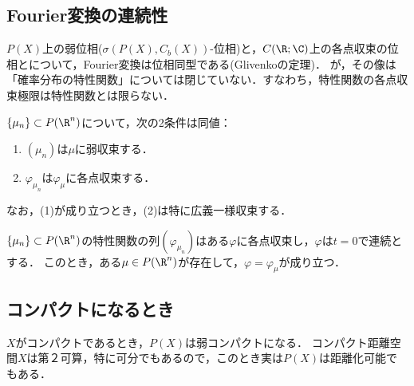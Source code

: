 \documentclass[uplatex,dvipdfmx]{jsreport}
\begin{document}
\subsection{Fourier変換の連続性}

\begin{tcolorbox}[colframe=ForestGreen, colback=ForestGreen!10!white,breakable,colbacktitle=ForestGreen!40!white,coltitle=black,fonttitle=\bfseries\sffamily,
    title=]
    $P(X)$上の弱位相($\sigma(P(X),C_b(X))$-位相)と，$C(\R;\C)$上の各点収束の位相とについて，Fourier変換は位相同型である(Glivenkoの定理)．
    が，その像は「確率分布の特性関数」については閉じていない．すなわち，特性関数の各点収束極限は特性関数とは限らない．
    \cite{ハンドブック}
\end{tcolorbox}

\begin{theorem}[Glivenko]
    $\{\mu_n\}\subset P(\R^n)$について，次の2条件は同値：
    \begin{enumerate}
        \item $(\mu_n)$は$\mu$に弱収束する．
        \item $\varphi_{\mu_n}$は$\varphi_\mu$に各点収束する．
    \end{enumerate}
    なお，(1)が成り立つとき，(2)は特に広義一様収束する．
\end{theorem}

\begin{theorem}[Levyの連続性定理]
    $\{\mu_n\}\subset P(\R^n)$の特性関数の列$(\varphi_{\mu_n})$はある$\varphi$に各点収束し，$\varphi$は$t=0$で連続とする．
    このとき，ある$\mu\in P(\R^n)$が存在して，$\varphi=\varphi_\mu$が成り立つ．
\end{theorem}

\subsection{コンパクトになるとき}

\begin{tcolorbox}[colframe=ForestGreen, colback=ForestGreen!10!white,breakable,colbacktitle=ForestGreen!40!white,coltitle=black,fonttitle=\bfseries\sffamily,
title=]
    $X$がコンパクトであるとき，$P(X)$は弱コンパクトになる．
    コンパクト距離空間$X$は第２可算，特に可分でもあるので，このとき実は$P(X)$は距離化可能でもある．
\end{tcolorbox}
\end{document}
